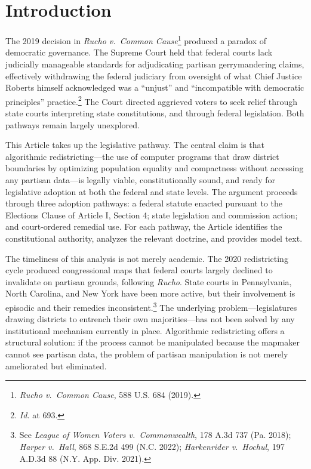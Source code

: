 \section{Introduction}
\label{sec:introduction}

The 2019 decision in \textit{Rucho v.\ Common Cause}\footnote{\textit{Rucho v.\ Common Cause}, 588 U.S. 684 (2019).} produced a paradox of democratic governance. The Supreme Court held that federal courts lack judicially manageable standards for adjudicating partisan gerrymandering claims, effectively withdrawing the federal judiciary from oversight of what Chief Justice Roberts himself acknowledged was a ``unjust'' and ``incompatible with democratic principles'' practice.\footnote{\textit{Id.} at 693.} The Court directed aggrieved voters to seek relief through state courts interpreting state constitutions, and through federal legislation. Both pathways remain largely unexplored.

This Article takes up the legislative pathway. The central claim is that algorithmic redistricting---the use of computer programs that draw district boundaries by optimizing population equality and compactness without accessing any partisan data---is legally viable, constitutionally sound, and ready for legislative adoption at both the federal and state levels. The argument proceeds through three adoption pathways: a federal statute enacted pursuant to the Elections Clause of Article I, Section 4; state legislation and commission action; and court-ordered remedial use. For each pathway, the Article identifies the constitutional authority, analyzes the relevant doctrine, and provides model text.

The timeliness of this analysis is not merely academic. The 2020 redistricting cycle produced congressional maps that federal courts largely declined to invalidate on partisan grounds, following \textit{Rucho}. State courts in Pennsylvania, North Carolina, and New York have been more active, but their involvement is episodic and their remedies inconsistent.\footnote{See \textit{League of Women Voters v.\ Commonwealth}, 178 A.3d 737 (Pa. 2018); \textit{Harper v.\ Hall}, 868 S.E.2d 499 (N.C. 2022); \textit{Harkenrider v.\ Hochul}, 197 A.D.3d 88 (N.Y. App. Div. 2021).} The underlying problem---legislatures drawing districts to entrench their own majorities---has not been solved by any institutional mechanism currently in place. Algorithmic redistricting offers a structural solution: if the process cannot be manipulated because the mapmaker cannot see partisan data, the problem of partisan manipulation is not merely ameliorated but eliminated.

